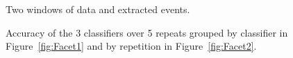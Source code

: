 \documentclass[a4paper,11pt]{article}
\begin{document}
\begin{figure}
	\centering
	\caption{Two windows of data and extracted events.}
	\label{fig:TwoWindows}
\end{figure}

\begin{figure}[!htb]
	\centering
	\caption{Accuracy of the 3 classifiers over 5 repeats grouped by classifier in Figure~\ref{fig:Facet1} and by repetition in Figure~\ref{fig:Facet2}.}
	\label{fig:3Classifiers}
\end{figure}
\end{document}
